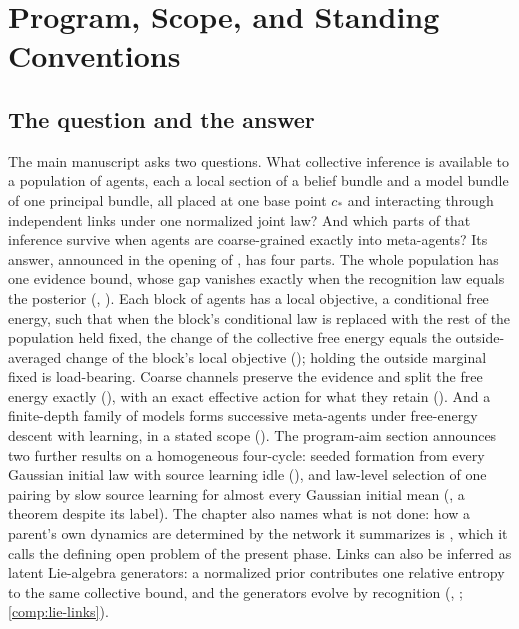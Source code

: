 \chapter{Program, Scope, and Standing Conventions}
\label{comp:ch01}

\section{The question and the answer}
\label{comp:ch01-question}

The main manuscript asks two questions. What collective inference is available to a population of
agents, each a local section of a belief bundle and a model bundle of one principal bundle, all
placed at one base point $c_*$ and interacting through independent links under one normalized joint
law? And which parts of that inference survive when agents are coarse-grained exactly into
meta-agents? Its answer, announced in the opening of , has four parts. The whole
population has one evidence bound, whose gap vanishes exactly when the recognition law equals the
posterior (, ). Each block of agents has a
local objective, a conditional free energy, such that when the block's conditional law is replaced
with the rest of the population held fixed, the change of the collective free energy equals the
outside-averaged change of the block's local objective (); holding
the outside marginal fixed is load-bearing. Coarse channels preserve the evidence and split the free
energy exactly (), with an exact effective action for what they retain
(). And a finite-depth family of models forms successive meta-agents
under free-energy descent with learning, in a stated scope ().
The program-aim section announces two further results on a homogeneous four-cycle: seeded formation
from every Gaussian initial law with source learning idle (),
and law-level selection of one pairing by slow source learning for almost every Gaussian initial
mean (, a theorem despite its label). The chapter also names what is
not done: how a parent's own dynamics are determined by the network it summarizes is
, which it calls the defining open problem of the present
phase. Links can also be inferred as latent Lie-algebra generators: a normalized prior contributes
one relative entropy to the same collective bound, and the generators evolve by recognition
(, ; \cref{comp:lie-links}).

